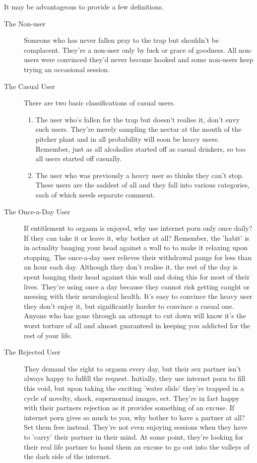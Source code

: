 \documentclass[easypeasy]{subfiles}
\begin{document}
It may be advantageous to provide a few definitions.
 \begin{description} 
   \item [The Non-user] Someone who has never fallen pray to the trap but shouldn't be complacent. They're a non-user only by luck or grace of goodness. All non-users were convinced they'd never become hooked and some non-users keep trying an occasional session.

   \item [The Casual User] There are two basic classifications of casual users.
\begin{enumerate}
\item The user who's fallen for the trap but doesn't realise it, don't envy such users. They're merely sampling the nectar at the mouth of the pitcher plant and in all probability will soon be heavy users. Remember, just as all alcoholics started off as casual drinkers, so too all users started off casually.

\item The user who was previously a heavy user so thinks they can't stop. These users are the saddest of all and they fall into various categories, each of which needs separate comment.
\end{enumerate}
    \item [The Once-a-Day User] If entitlement to orgasm is enjoyed, why use internet porn only once daily? If they can take it or leave it, why bother at all? Remember, the 'habit' is in actuality banging your head against a wall to to make it relaxing upon stopping. The once-a-day user relieves their withdrawal pangs for less than an hour each day. Although they don't realise it, the rest of the day is spent banging their head against this wall and doing this for most of their lives. They're using once a day because they cannot risk getting caught or messing with their neurological health. It's easy to convince the heavy user they don't enjoy it, but significantly harder to convince a casual one. Anyone who has gone through an attempt to cut down will know it's the worst torture of all and almost guaranteed in keeping you addicted for the rest of your life.

    \item [The Rejected User] They demand the right to orgasm every day, but their sex partner isn't always happy to fulfill the request. Initially, they use internet porn to fill this void, but upon taking the exciting 'water slide' they're trapped in a cycle of novelty, shock, supernormal images, ect. They're in fact happy with their partners rejection as it provides something of an excuse. If internet porn gives so much to you, why bother to have a partner at all? Set them free instead. They're not even enjoying sessions when they have to 'carry' their partner in their mind. At some point, they're looking for their real life partner to hand them an excuse to go out into the valleys of the dark side of the internet.


\end{description}
\end{document}
